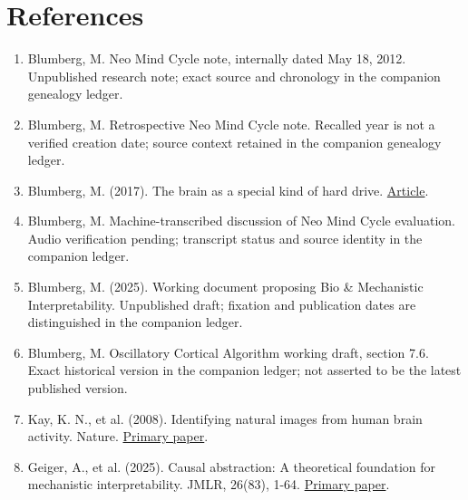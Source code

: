 \documentclass[11pt,letterpaper]{article}
\begin{document}
\section*{References}
\begin{enumerate}[label=\arabic*.,itemsep=0.35em]

\item\label{ref:1}\begingroup{} Blumberg, M. Neo Mind Cycle note, internally dated May 18, 2012. Unpublished research note; exact source and chronology in the companion genealogy ledger.\par\endgroup
\item\label{ref:2}\begingroup{} Blumberg, M. Retrospective Neo Mind Cycle note. Recalled year is not a verified creation date; source context retained in the companion genealogy ledger.\par\endgroup
\item\label{ref:3}\begingroup{} Blumberg, M. (2017). The brain as a special kind of hard drive. \href{https://medium.com/silicon-valley-global-news/the-brain-as-a-special-kind-of-hard-drive-4bd3a99dba4c}{Article}.\par\endgroup
\item\label{ref:4}\begingroup{} Blumberg, M. Machine-transcribed discussion of Neo Mind Cycle evaluation. Audio verification pending; transcript status and source identity in the companion ledger.\par\endgroup
\item\label{ref:5}\begingroup{} Blumberg, M. (2025). Working document proposing Bio \& Mechanistic Interpretability. Unpublished draft; fixation and publication dates are distinguished in the companion ledger.\par\endgroup
\item\label{ref:6}\begingroup{} Blumberg, M. Oscillatory Cortical Algorithm working draft, section 7.6. Exact historical version in the companion ledger; not asserted to be the latest published version.\par\endgroup
\item\label{ref:7}\begingroup{} Kay, K. N., et al. (2008). Identifying natural images from human brain activity. Nature. \href{https://www.nature.com/articles/nature06713}{Primary paper}.\par\endgroup
\item\label{ref:8}\begingroup{} Geiger, A., et al. (2025). Causal abstraction: A theoretical foundation for mechanistic interpretability. JMLR, 26(83), 1-64. \href{https://jmlr.org/papers/v26/23-0058.html}{Primary paper}.\par\endgroup

\end{enumerate}
\end{document}
